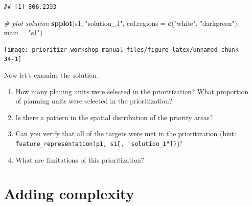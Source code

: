 \documentclass[12pt,]{book}
\newenvironment{Shaded}{\begin{snugshade}}{\end{snugshade}}
\newcommand{\KeywordTok}[1]{\textcolor[rgb]{0.13,0.29,0.53}{\textbf{#1}}}
\newcommand{\DataTypeTok}[1]{\textcolor[rgb]{0.13,0.29,0.53}{#1}}
\newcommand{\DecValTok}[1]{\textcolor[rgb]{0.00,0.00,0.81}{#1}}
\newcommand{\StringTok}[1]{\textcolor[rgb]{0.31,0.60,0.02}{#1}}
\newcommand{\CommentTok}[1]{\textcolor[rgb]{0.56,0.35,0.01}{\textit{#1}}}
\newcommand{\OperatorTok}[1]{\textcolor[rgb]{0.81,0.36,0.00}{\textbf{#1}}}
\newcommand{\NormalTok}[1]{#1}
\providecommand{\tightlist}{%
  \setlength{\itemsep}{0pt}\setlength{\parskip}{0pt}}
\let\BeginKnitrBlock\begin \let\EndKnitrBlock\end
\begin{document}
\begin{Shaded}
\end{Shaded}

\begin{verbatim}
## [1] 806.2393
\end{verbatim}

\begin{Shaded}
\begin{Highlighting}[]
\CommentTok{# plot solution}
\KeywordTok{spplot}\NormalTok{(s1, }\StringTok{"solution_1"}\NormalTok{, }\DataTypeTok{col.regions =} \KeywordTok{c}\NormalTok{(}\StringTok{"white"}\NormalTok{, }\StringTok{"darkgreen"}\NormalTok{), }\DataTypeTok{main =} \StringTok{"s1"}\NormalTok{)}
\end{Highlighting}
\end{Shaded}

\begin{center}\texttt{[image: prioritizr-workshop-manual\_files/figure-latex/unnamed-chunk-34-1]} \end{center}

Now let's examine the solution.

\BeginKnitrBlock{rmdquestion}
\begin{enumerate}
\def\labelenumi{\arabic{enumi}.}
\tightlist
\item
  How many planing units were selected in the prioritization? What
  proportion of planning units were selected in the prioritization?
\item
  Is there a pattern in the spatial distribution of the priority areas?
\item
  Can you verify that all of the targets were met in the prioritization
  (hint:
  \texttt{feature\_representation(p1,\ s1{[},\ "solution\_1"{]})})?
\item
  What are limitations of this prioritization?
\end{enumerate}
\EndKnitrBlock{rmdquestion}

\section{Adding complexity}\label{adding-complexity}
\end{document}
